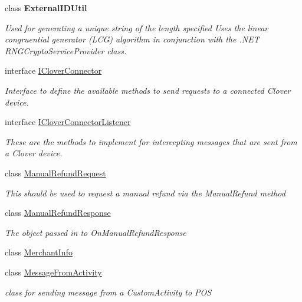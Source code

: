 \begin{DoxyCompactItemize}
class {\bfseries External\+I\+D\+Util}
\begin{DoxyCompactList}\small\item\em Used for generating a unique string of the length specified Uses the linear congruential generator (L\+CG) algorithm in conjunction with the .N\+ET R\+N\+G\+Crypto\+Service\+Provider class. \end{DoxyCompactList}\item 
interface \hyperlink{interfacecom_1_1clover_1_1remotepay_1_1sdk_1_1_i_clover_connector}{I\+Clover\+Connector}
\begin{DoxyCompactList}\small\item\em Interface to define the available methods to send requests to a connected Clover device. \end{DoxyCompactList}\item 
interface \hyperlink{interfacecom_1_1clover_1_1remotepay_1_1sdk_1_1_i_clover_connector_listener}{I\+Clover\+Connector\+Listener}
\begin{DoxyCompactList}\small\item\em These are the methods to implement for intercepting messages that are sent from a Clover device. \end{DoxyCompactList}\item 
class \hyperlink{classcom_1_1clover_1_1remotepay_1_1sdk_1_1_manual_refund_request}{Manual\+Refund\+Request}
\begin{DoxyCompactList}\small\item\em This should be used to request a manual refund via the Manual\+Refund method \end{DoxyCompactList}\item 
class \hyperlink{classcom_1_1clover_1_1remotepay_1_1sdk_1_1_manual_refund_response}{Manual\+Refund\+Response}
\begin{DoxyCompactList}\small\item\em The object passed in to On\+Manual\+Refund\+Response \end{DoxyCompactList}\item 
class \hyperlink{classcom_1_1clover_1_1remotepay_1_1sdk_1_1_merchant_info}{Merchant\+Info}
\item 
class \hyperlink{classcom_1_1clover_1_1remotepay_1_1sdk_1_1_message_from_activity}{Message\+From\+Activity}
\begin{DoxyCompactList}\small\item\em class for sending message from a Custom\+Activity to P\+OS \end{DoxyCompactList}\item 

\end{DoxyCompactItemize}

